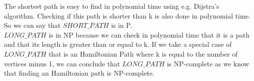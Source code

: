 
The shortest path is easy to find in polynomial time using e.g. Dijstra's algorithm. Checking if this path is shorter than k is also done in polynomial time. So we can say that $SHORT\_PATH$ is in P.\\

$LONG\_PATH$ is in NP because we can check in polynomial time that it is a path and that its length is greater than or equal to k. If we take a special case of $LONG\_PATH$ that is an Hamiltonian Path where k is equal to the number of vertices minus 1, we can conclude that $LONG\_PATH$ is NP-complete as we know that finding an Hamiltonian path is NP-complete.